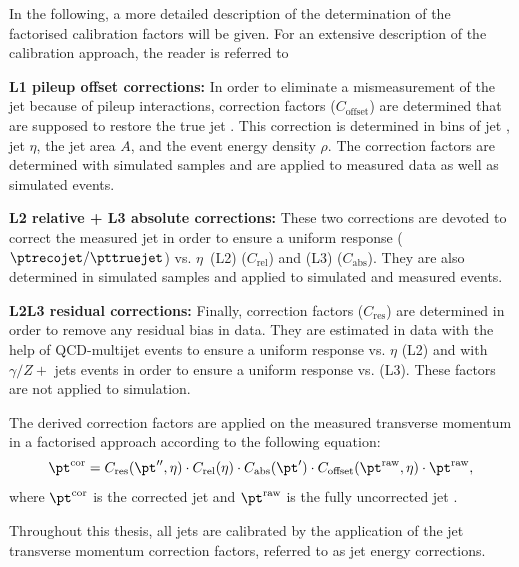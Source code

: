 In the following, a more detailed description of the determination of the factorised calibration factors will be given.
For an extensive description of the calibration approach, the reader is referred to~\cite{bib:CMS:JERCPaper_2011}
\begin{description}
\item \textbf{L1 pileup offset corrections:} In order to eliminate a mismeasurement of the jet \pt because of pileup interactions, correction factors ($C_{\mathrm{offset}}$) are determined that are supposed to restore the true jet \pt. This correction is determined in bins of jet \pt, jet $\eta$, the jet area $A$, and the event energy density $\rho$. The correction factors are determined with simulated samples and are applied to measured data as well as simulated events.
\item \textbf{L2 relative + L3 absolute corrections:} These two corrections are devoted to correct the measured jet \pt in order to ensure a uniform response ($\ptrecojet/\pttruejet$) vs. \mbox{$\eta$ (L2)} ($C_{\mathrm{rel}}$) and \mbox{\pt (L3)} ($C_{\mathrm{abs}}$). They are also determined in simulated samples and applied to simulated and measured events.
\item \textbf{L2L3 residual corrections:} Finally, correction factors ($C_\mathrm{res}$) are determined in order to remove any residual bias in data. They are estimated in data with the help of QCD-multijet events to ensure a uniform response vs. $\eta$ (L2) and with $\gamma/Z+$ jets events in order to ensure a uniform response vs. \pt (L3).
These factors are not applied to simulation.\\
\end{description}

The derived correction factors are applied on the measured transverse momentum in a factorised approach according to the following equation:
\begin{equation}
\pt^\mathrm{cor} =  C_\mathrm{res}(\pt'', \eta) \cdot C_{\mathrm{rel}}(\eta) \cdot C_{\mathrm{abs}}(\pt') \cdot C_{\mathrm{offset}}(\pt^\mathrm{raw}, \eta) \cdot  \pt^\mathrm{raw},
\end{equation}
where $\pt^\mathrm{cor}$ is the corrected jet \pt and  $\pt^\mathrm{raw}$ is the fully uncorrected jet \pt.

Throughout this thesis, all jets are calibrated by the application of the jet transverse momentum correction factors, referred to as jet energy corrections.


